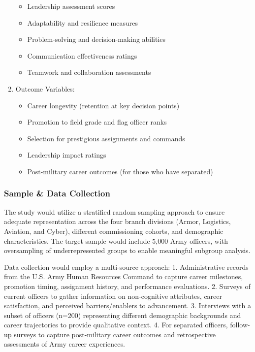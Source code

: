 \documentclass[
  letterpaper,
  DIV=11,
  numbers=noendperiod]{scrartcl}
\providecommand{\tightlist}{%
  \setlength{\itemsep}{0pt}\setlength{\parskip}{0pt}}
\begin{document}
\begin{enumerate}
  \begin{itemize}
  \tightlist
  \item
    Leadership assessment scores
  \item
    Adaptability and resilience measures
  \item
    Problem-solving and decision-making abilities
  \item
    Communication effectiveness ratings
  \item
    Teamwork and collaboration assessments
  \end{itemize}
\item
  Outcome Variables:

  \begin{itemize}
  \tightlist
  \item
    Career longevity (retention at key decision points)
  \item
    Promotion to field grade and flag officer ranks
  \item
    Selection for prestigious assignments and commands
  \item
    Leadership impact ratings
  \item
    Post-military career outcomes (for those who have separated)
  \end{itemize}
\end{enumerate}

\subsubsection{Sample \& Data Collection}\label{sample-data-collection}

The study would utilize a stratified random sampling approach to ensure
adequate representation across the four branch divisions (Armor,
Logistics, Aviation, and Cyber), different commissioning cohorts, and
demographic characteristics. The target sample would include 5,000 Army
officers, with oversampling of underrepresented groups to enable
meaningful subgroup analysis.

Data collection would employ a multi-source approach: 1. Administrative
records from the U.S. Army Human Resources Command to capture career
milestones, promotion timing, assignment history, and performance
evaluations. 2. Surveys of current officers to gather information on
non-cognitive attributes, career satisfaction, and perceived
barriers/enablers to advancement. 3. Interviews with a subset of
officers (n=200) representing different demographic backgrounds and
career trajectories to provide qualitative context. 4. For separated
officers, follow-up surveys to capture post-military career outcomes and
retrospective assessments of Army career experiences.
\end{document}
